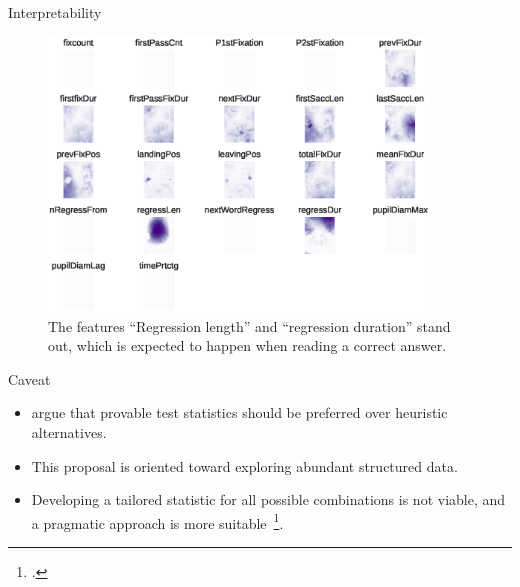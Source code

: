 \documentclass[10pt,compress]{beamer}
\begin{document}
\begin{frame}{Interpretability}
    \begin{figure}
        \centering
        \includegraphics[trim=5pt 75pt 5pt 5pt,clip,width=0.9\textwidth]{eye_features.eps}
        \caption{
            The features ``Regression length'' and ``regression duration'' stand out,
            which is expected to happen when reading a correct answer.
        }
    \end{figure}
\end{frame}


\begin{frame}{Caveat}
    \begin{itemize}
        \item \cite{rosenblatt2019better} argue that provable test statistics
            should be preferred over heuristic alternatives.
        \item This proposal is oriented toward exploring abundant structured data.
        \item Developing a tailored statistic for all possible combinations is not viable,
            and a pragmatic approach is more suitable~\footcite{kim2021classification}.
    \end{itemize}
\end{frame}
\end{document}

